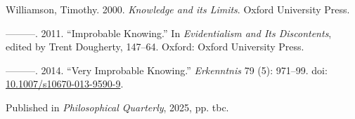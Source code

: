 \documentclass[
  11pt,
  letterpaper,
  DIV=11,
  numbers=noendperiod,
  twoside]{scrartcl}
\newlength{\cslhangindent}
\newenvironment{CSLReferences}[2] %
 {\begin{list}{}{%
  \setlength{\itemindent}{0pt}
  \setlength{\leftmargin}{0pt}
  \setlength{\parsep}{0pt}
  \ifodd #1
   \setlength{\leftmargin}{\cslhangindent}
   \setlength{\itemindent}{-1\cslhangindent}
  \fi
  \setlength{\itemsep}{#2\baselineskip}}}
 {\end{list}}
\begin{document}
\begin{CSLReferences}{1}{0}
Williamson, Timothy. 2000. \emph{{Knowledge and its Limits}}. Oxford
University Press.

---------. 2011. {``Improbable Knowing.''} In \emph{Evidentialism and
Its Discontents}, edited by Trent Dougherty, 147--64. Oxford: Oxford
University Press.

---------. 2014. {``Very Improbable Knowing.''} \emph{Erkenntnis} 79
(5): 971--99. doi:
\href{https://doi.org/10.1007/s10670-013-9590-9}{10.1007/s10670-013-9590-9}.

\end{CSLReferences}



\noindent Published in\emph{
Philosophical Quarterly}, 2025, pp. tbc.
\end{document}
